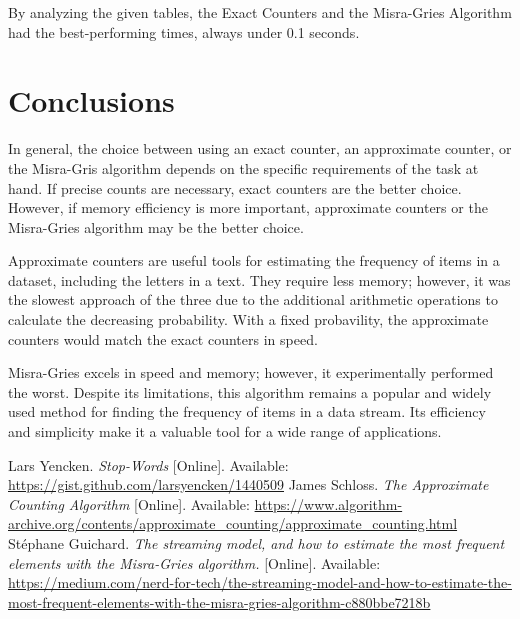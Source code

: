 \documentclass[]{revdetua}
\begin{document}
By analyzing the given tables, the Exact Counters and the Misra-Gries Algorithm had the best-performing times, always under 0.1 seconds.

\section{Conclusions}

In general, the choice between using an exact counter, an approximate counter, or the Misra-Gris algorithm depends on the specific requirements of the task at hand. If precise counts are necessary, exact counters are the better choice. However, if memory efficiency is more important, approximate counters or the Misra-Gries algorithm may be the better choice. 

Approximate counters are useful tools for estimating the frequency of items in a dataset, including the letters in a text. They require less memory; however, it was the slowest approach of the three due to the additional arithmetic operations to calculate the decreasing probability. With a fixed probavility, the approximate counters would match the exact counters in speed.

Misra-Gries excels in speed and memory; however, it experimentally performed the worst. Despite its limitations, this algorithm remains a popular and widely used method for finding the frequency of items in a data stream. Its efficiency and simplicity make it a valuable tool for a wide range of applications.

\begin{thebibliography}{00}

 Lars Yencken. \textit{Stop-Words} [Online]. Available: \url{https://gist.github.com/larsyencken/1440509}
 James Schloss. \textit{The Approximate Counting Algorithm} [Online]. Available: \url{https://www.algorithm-archive.org/contents/approximate_counting/approximate_counting.html}
 Stéphane Guichard. \textit{The streaming model, and how to estimate the most frequent elements with the Misra-Gries algorithm.} [Online]. Available: \url{https://medium.com/nerd-for-tech/the-streaming-model-and-how-to-estimate-the-most-frequent-elements-with-the-misra-gries-algorithm-c880bbe7218b}

\end{thebibliography}
\end{document}
